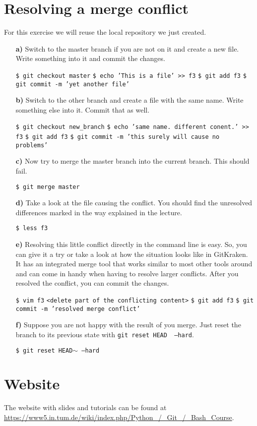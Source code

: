 \documentclass[11pt]{article}
\begin{document}
\section*{Resolving a merge conflict}
For this exercise we will reuse the local repository we just created.
%
\begin{itemize}
\item[\bf{a)}] Switch to the master branch if you are not on it and create a new file. Write something into it and commit the changes.
\begin{framed}
\texttt{\$ git checkout master} \newline
\texttt{\$ echo 'This is a file' >> f3} \newline
\texttt{\$ git add f3} \newline
\texttt{\$ git commit -m 'yet another file'}
\end{framed}
\item[\bf{b)}]  Switch to the other branch and create a file with the same name. Write something else into it. Commit that as well.
\begin{framed}
\texttt{\$ git checkout new\_branch} \newline
\texttt{\$ echo 'same name. different conent.' >> f3} \newline
\texttt{\$ git add f3} \newline
\texttt{\$ git commit -m 'this surely will cause no problems'}
\end{framed}
\item[\bf{c)}] Now try to merge the master branch into the current branch. This should fail.
\begin{framed}
\texttt{\$ git merge master}
\end{framed}
\item[\bf{d)}] Take a look at the file causing the conflict. You should find the unresolved differences marked in the way explained in the lecture.
\begin{framed}
\texttt{\$ less f3}
\end{framed}
\item[\bf{e)}] Resolving this little conflict directly in the command line is easy. So, you can give it a try or take a look at how the situation looks like in GitKraken. It has an integrated merge tool that works similar to most other tools around and can come in handy when having to resolve larger conflicts. After you resolved the conflict, you can commit the changes.
\begin{framed}
\texttt{\$ vim f3} \newline
\texttt{<delete part of the conflicting content>} \newline
\texttt{\$ git add f3} \newline
\texttt{\$ git commit -m 'resolved merge conflict'}
\end{framed}
\item[\bf{f)}] Suppose you are not happy with the result of you merge. Just reset the branch to its previous state with \texttt{git reset HEAD~ --hard}.
\begin{framed}
\texttt{\$ git reset HEAD$\sim$ --hard}
\end{framed}
\end{itemize}

\section*{Website}
The website with slides and tutorials can be found at\\
\url{https://www5.in.tum.de/wiki/index.php/Python_/_Git_/_Bash_Course}.
\end{document}
